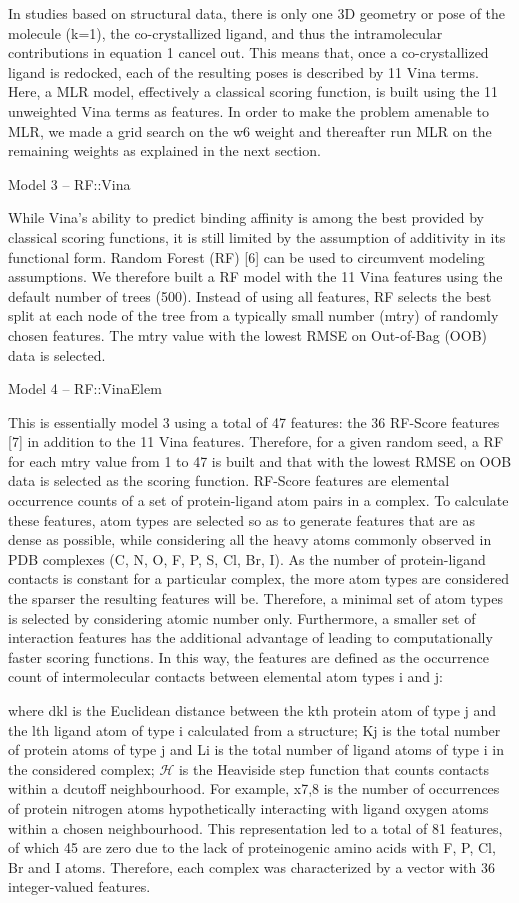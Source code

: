 \documentclass[twocolumn]{bmcart}
\begin{document}
In studies based on structural data, there is only one 3D geometry or pose of the molecule (k=1), the co-crystallized ligand, and thus the intramolecular contributions in equation 1 cancel out. This means that, once a co-crystallized ligand is redocked, each of the resulting poses is described by 11 Vina terms. Here, a MLR model, effectively a classical scoring function, is built using the 11 unweighted Vina terms as features. In order to make the problem amenable to MLR, we made a grid search on the w6 weight and thereafter run MLR on the remaining weights as explained in the next section.

Model 3 – RF::Vina

While Vina’s ability to predict binding affinity is among the best provided by classical scoring functions, it is still limited by the assumption of additivity in its functional form. Random Forest (RF) [6] can be used to circumvent modeling assumptions. We therefore built a RF model with the 11 Vina features using the default number of trees (500). Instead of using all features, RF selects the best split at each node of the tree from a typically small number (mtry) of randomly chosen features. The mtry value with the lowest RMSE on Out-of-Bag (OOB) data is selected. 

Model 4 – RF::VinaElem

This is essentially model 3 using a total of 47 features: the 36 RF-Score features [7] in addition to the 11 Vina features. Therefore, for a given random seed, a RF for each mtry value from 1 to 47 is built and that with the lowest RMSE on OOB data is selected as the scoring function. RF-Score features are elemental occurrence counts of a set of protein-ligand atom pairs in a complex. To calculate these features, atom types are selected so as to generate features that are as dense as possible, while considering all the heavy atoms commonly observed in PDB complexes (C, N, O, F, P, S, Cl, Br, I). As the number of protein-ligand contacts is constant for a particular complex, the more atom types are considered the sparser the resulting features will be. Therefore, a minimal set of atom types is selected by considering atomic number only. Furthermore, a smaller set of interaction features has the additional advantage of leading to computationally faster scoring functions. In this way, the features are defined as the occurrence count of intermolecular contacts between elemental atom types i and j:
 
where dkl is the Euclidean distance between the kth protein atom of type j and the lth ligand atom of type i calculated from a structure; Kj is the total number of protein atoms of type j and Li is the total number of ligand atoms of type i in the considered complex; $\mathcal{H}$ is the Heaviside step function that counts contacts within a dcutoff neighbourhood. For example, x7,8 is the number of occurrences of protein nitrogen atoms hypothetically interacting with ligand oxygen atoms within a chosen neighbourhood. This representation led to a total of 81 features, of which 45 are zero due to the lack of proteinogenic amino acids with F, P, Cl, Br and I atoms. Therefore, each complex was characterized by a vector with 36 integer-valued features.
\end{document}
